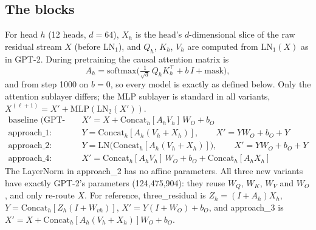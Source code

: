 \documentclass[11pt]{article}
\newcommand{\cat}{\mathrm{Concat}_h}
\newcommand{\aone}{approach\_1}
\newcommand{\atwo}{approach\_2}
\newcommand{\afour}{approach\_4}
\newcommand{\tr}{three\_residual}
\begin{document}
\subsection{The blocks}
For head $h$ (12 heads, $d = 64$), $X_h$ is the head's $d$-dimensional slice of the raw residual stream $X$ (before
$\mathrm{LN}_1$), and $Q_h$, $K_h$, $V_h$ are computed from $\mathrm{LN}_1(X)$ as in GPT-2. During pretraining the
causal attention matrix is
\[
A_h = \mathrm{softmax}\!\Big(\tfrac{1}{\sqrt d}\,Q_hK_h^\top + b\,I + \text{mask}\Big),
\]
and from step 1000 on $b = 0$, so every model is exactly as defined below. Only the attention sublayer differs;
the MLP sublayer is standard in all variants, $X^{(\ell+1)} = X' + \mathrm{MLP}(\mathrm{LN}_2(X'))$.
\begin{align}
\text{baseline (GPT-2):}\quad & X' = X + \cat[A_hV_h]\,W_O + b_O \\
\text{\aone{}:}\quad & Y = \cat[A_h(V_h + X_h)], \qquad X' = Y W_O + b_O + Y \label{eq:a1}\\
\text{\atwo{}:}\quad & Y = \mathrm{LN}\big(\cat[A_h(V_h + X_h)]\big), \qquad X' = Y W_O + b_O + Y \label{eq:a2}\\
\text{\afour{}:}\quad & X' = \cat[A_hV_h]\,W_O + b_O + \cat[A_hX_h] \label{eq:a4}
\end{align}
The LayerNorm in \atwo{} has no affine parameters. All three new variants have exactly GPT-2's parameters (124{,}475{,}904): they reuse $W_Q$, $W_K$, $W_V$ and
$W_O$, and only re-route $X$. For reference, \tr{} is $Z_h = (I + A_h)X_h$, $Y = \cat[Z_h(I + W_{vh})]$,
$X' = Y(I + W_O) + b_O$, and approach\_3 is $X' = X + \cat[A_h(V_h+X_h)]W_O + b_O$.
\end{document}
